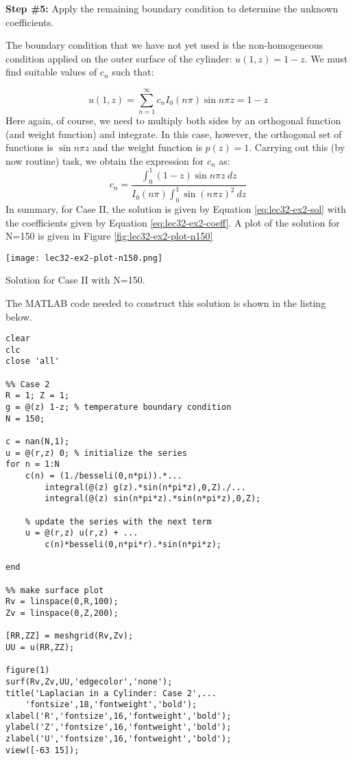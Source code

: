 \vspace{0.25cm}

\noindent\textbf{Step \#5:} Apply the remaining boundary condition to determine the unknown coefficients.

\vspace{0.25cm}

\noindent The boundary condition that we have not yet used is the non-homogeneous condition applied on the outer surface of the cylinder: $u(1,z) = 1-z$.  We must find suitable values of $c_n$ such that:

\begin{equation*}
u(1,z) = \sum\limits_{n=1}^{\infty} c_n I_0(n \pi)\sin{n \pi z} = 1-z
\end{equation*}
Here again, of course, we need to multiply both sides by an orthogonal function (and weight function) and integrate.  In this case, however, the orthogonal set of functions is $\sin{n\pi z}$ and the weight function is $p(z)=1$.  Carrying out this (by now routine) task, we obtain the expression for $c_n$ as:
\begin{equation}
c_n = \frac{\int_0^1 (1-z)\sin{n \pi z} \ dz}{I_0(n \pi) \int_0^1 \sin{(n \pi z)}^2 \ dz}
\label{eq:lec32-ex2-coeff}
\end{equation}
In summary, for Case II, the solution is given by Equation \ref{eq:lec32-ex2-sol} with the coefficients given by Equation \ref{eq:lec32-ex2-coeff}.  A plot of the solution for N=150 is given in Figure \ref{fig:lec32-ex2-plot-n150}
\begin{marginfigure}
\texttt{[image: lec32-ex2-plot-n150.png]}
\caption{Solution for Case II with N=150.}
\label{fig:lec32-ex2-plot-n150}
\end{marginfigure}
The MATLAB code needed to construct this solution is shown in the listing below.
\begin{lstlisting}[style=myMatlab, name=lec32-ex2]
clear
clc
close 'all'

%% Case 2
R = 1; Z = 1;
g = @(z) 1-z; % temperature boundary condition
N = 150;

c = nan(N,1);
u = @(r,z) 0; % initialize the series
for n = 1:N
    c(n) = (1./besseli(0,n*pi)).*...
        integral(@(z) g(z).*sin(n*pi*z),0,Z)./...
        integral(@(z) sin(n*pi*z).*sin(n*pi*z),0,Z);
    
    % update the series with the next term
    u = @(r,z) u(r,z) + ...
        c(n)*besseli(0,n*pi*r).*sin(n*pi*z);
    
end

%% make surface plot
Rv = linspace(0,R,100);
Zv = linspace(0,Z,200);

[RR,ZZ] = meshgrid(Rv,Zv);
UU = u(RR,ZZ);

figure(1)
surf(Rv,Zv,UU,'edgecolor','none');
title('Laplacian in a Cylinder: Case 2',...
    'fontsize',18,'fontweight','bold');
xlabel('R','fontsize',16,'fontweight','bold');
ylabel('Z','fontsize',16,'fontweight','bold');
zlabel('U','fontsize',16,'fontweight','bold');
view([-63 15]);
\end{lstlisting}

